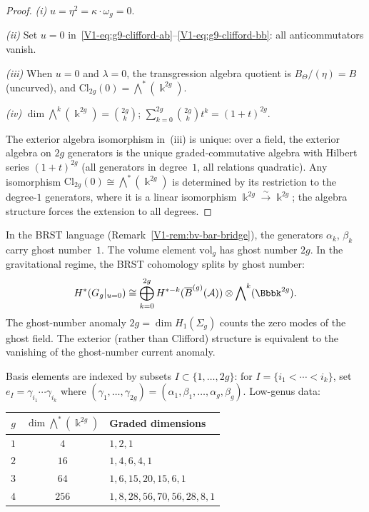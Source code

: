 \begin{proof}
\emph{(i)} $u = \eta^2 = \kappa \cdot \omega_g = 0$.

\emph{(ii)} Set $u = 0$
in~\eqref{V1-eq:g9-clifford-ab}--\eqref{V1-eq:g9-clifford-bb}: all
anticommutators vanish.

\emph{(iii)} When $u = 0$ and $\lambda = 0$, the transgression
algebra quotient is $B_\Theta/(\eta) = B$ (uncurved), and
$\mathrm{Cl}_{2g}(0) = \bigwedge^*(\Bbbk^{2g})$.

\emph{(iv)} $\dim\bigwedge^k(\Bbbk^{2g}) = \binom{2g}{k}$;
$\sum_{k=0}^{2g}\binom{2g}{k}t^k = (1+t)^{2g}$.

The exterior algebra isomorphism in~(iii) is unique: over a
field, the exterior algebra on $2g$ generators is the unique
graded-commutative algebra with Hilbert series $(1+t)^{2g}$
(all generators in degree~$1$, all relations quadratic).
Any isomorphism $\mathrm{Cl}_{2g}(0) \cong
\bigwedge^*(\Bbbk^{2g})$ is determined by its restriction to
the degree-$1$ generators, where it is a linear isomorphism
$\Bbbk^{2g} \xrightarrow{\sim} \Bbbk^{2g}$; the algebra
structure forces the extension to all degrees.
\end{proof}

\begin{remark}
In the BRST language (Remark~\ref{V1-rem:bv-bar-bridge}), the generators
$\alpha_k$, $\beta_k$ carry ghost number~$1$. The volume element
$\mathrm{vol}_g$ has ghost number $2g$. In the gravitational regime,
the BRST cohomology splits by ghost number:
\[
H^*(G_g|_{u=0}) \cong
\bigoplus_{k=0}^{2g} H^{*-k}(\barB^{(g)}(\cA))
\otimes \bigwedge\nolimits^k(\Bbbk^{2g}).
\]
The ghost-number anomaly $2g = \dim H_1(\Sigma_g)$ counts the zero
modes of the ghost field. The exterior (rather than Clifford) structure
is equivalent to the vanishing of the ghost-number current anomaly.
\end{remark}

\begin{remark}
Basis elements are indexed by subsets $I \subset \{1, \ldots, 2g\}$:
for $I = \{i_1 < \cdots < i_k\}$, set $e_I = \gamma_{i_1}\cdots
\gamma_{i_k}$ where $(\gamma_1, \ldots, \gamma_{2g}) =
(\alpha_1, \beta_1, \ldots, \alpha_g, \beta_g)$.
Low-genus data:
\begin{center}
\renewcommand{\arraystretch}{1.2}
\begin{tabular}{ccl}
\toprule
$g$ & $\dim\bigwedge^*(\Bbbk^{2g})$ & Graded dimensions \\
\midrule
$1$ & $4$ & $1, 2, 1$ \\
$2$ & $16$ & $1, 4, 6, 4, 1$ \\
$3$ & $64$ & $1, 6, 15, 20, 15, 6, 1$ \\
$4$ & $256$ & $1, 8, 28, 56, 70, 56, 28, 8, 1$ \\
\bottomrule
\end{tabular}
\end{center}
\end{remark}

